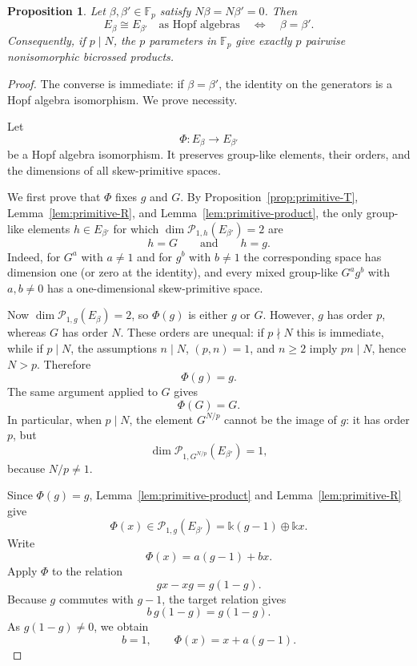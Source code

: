\documentclass[twoside,11pt]{amsart}
\newtheorem{pro}[defi]{Proposition}
\newcommand{\K}{\mathds{k}}
\newcommand{\F}{\mathbb{F}}
\newcommand{\Pp}{\mathcal{P}}
\begin{document}
	
	\begin{pro}\label{prop:isom}
		Let $\beta,\beta'\in\F_p$ satisfy $N\beta=N\beta'=0$. Then
		\[
		E_\beta\cong E_{\beta'}
		\quad\text{as Hopf algebras}
		\quad\Longleftrightarrow\quad
		\beta=\beta'.
		\]
		Consequently, if $p\mid N$, the $p$ parameters in $\F_p$ give exactly $p$
		pairwise nonisomorphic bicrossed products.
	\end{pro}
	
	\begin{proof}
		The converse is immediate: if $\beta=\beta'$, the identity on the generators
		is a Hopf algebra isomorphism. We prove necessity.
		
		Let
		\[
		\Phi:E_\beta\longrightarrow E_{\beta'}
		\]
		be a Hopf algebra isomorphism. It preserves group-like elements, their
		orders, and the dimensions of all skew-primitive spaces.
		
		We first prove that $\Phi$ fixes $g$ and $G$. By
		Proposition~\ref{prop:primitive-T}, Lemma~\ref{lem:primitive-R}, and
		Lemma~\ref{lem:primitive-product}, the only group-like elements
		$h\in E_{\beta'}$ for which
		$\dim\Pp_{1,h}(E_{\beta'})=2$ are
		\[
		h=G
		\qquad\text{and}\qquad
		h=g.
		\]
		Indeed, for $G^a$ with $a\ne1$ and for $g^b$ with $b\ne1$ the corresponding
		space has dimension one (or zero at the identity), and every mixed group-like
		$G^ag^b$ with $a,b\ne0$ has a one-dimensional skew-primitive space.
		
		Now $\dim\Pp_{1,g}(E_\beta)=2$, so $\Phi(g)$ is either $g$ or $G$.
		However, $g$ has order $p$, whereas $G$ has order $N$. These orders are
		unequal: if $p\nmid N$ this is immediate, while if $p\mid N$, the assumptions
		$n\mid N$, $(p,n)=1$, and $n\ge2$ imply $pn\mid N$, hence $N>p$. Therefore
		\[
		\Phi(g)=g.
		\]
		The same argument applied to $G$ gives
		\[
		\Phi(G)=G.
		\]
		In particular, when $p\mid N$, the element $G^{N/p}$ cannot be the image of
		$g$: it has order $p$, but
		\[
		\dim\Pp_{1,G^{N/p}}(E_{\beta'})=1,
		\]
		because $N/p\ne1$.
		
		Since $\Phi(g)=g$, Lemma~\ref{lem:primitive-product} and
		Lemma~\ref{lem:primitive-R} give
		\[
		\Phi(x)\in\Pp_{1,g}(E_{\beta'})
		=\K(g-1)\oplus\K x.
		\]
		Write
		\[
		\Phi(x)=a(g-1)+bx.
		\]
		Apply $\Phi$ to the relation
		\[
		gx-xg=g(1-g).
		\]
		Because $g$ commutes with $g-1$, the target relation gives
		\[
		b\,g(1-g)=g(1-g).
		\]
		As $g(1-g)\ne0$, we obtain
		\begin{equation}\label{eq:Phi-x}
			b=1,
			\qquad
			\Phi(x)=x+a(g-1).
		\end{equation}
		

\end{proof}
\end{document}
